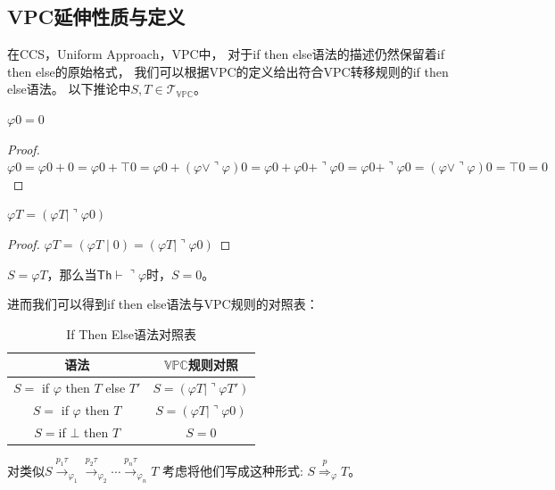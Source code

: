 \subsection{VPC延伸性质与定义}

在CCS，Uniform Approach，VPC中，
对于if then else语法的描述仍然保留着if then else的原始格式，
我们可以根据VPC的定义给出符合VPC转移规则的if then else语法。
以下推论中$S,T\in \mathcal{T}_{\mathbb{VPC}}$。
\begin{corollary} 
   $\varphi 0 = 0$
\end{corollary}
\begin{proof}
   $\varphi 0 = \varphi 0 + 0 = \varphi 0 + \top 0 = \varphi 0 + (\varphi \vee \urcorner \varphi)0 = \varphi 0 + \varphi 0 + \urcorner \varphi 0 = \varphi 0 + \urcorner \varphi 0 = (\varphi \vee \urcorner \varphi)0 = \top 0 = 0$
\end{proof}
\begin{corollary}
   $\varphi T = (\varphi T\mid \urcorner \varphi 0)$
\end{corollary}
\begin{proof}
   $\varphi T = (\varphi T\mid 0) = (\varphi T\mid \urcorner \varphi 0)$
\end{proof}
\begin{corollary}
   $S=\varphi T$，那么当$\mathsf{Th}\vdash \urcorner \varphi$时，$S=0$。
\end{corollary}
进而我们可以得到if then else语法与VPC规则的对照表：
\begin{table}[!hpt]
   \caption[If Then Else语法对照表]{If Then Else语法对照表\footnotemark}
   \label{tab:ifthenelse}
   \centering
   \begin{tabular}{@{}cc@{}} \toprule
     语法 & $\mathbb{VPC}$规则对照 \\ \midrule
     $S=$ if $\varphi$ then $T$ else $T'$& $S=(\varphi T|\urcorner \varphi T')$\\
     $S=$ if $\varphi$ then $T$ & $S=(\varphi T|\urcorner\varphi 0)$\\
     $S = $if $\bot$ then $T$ & $S=0$\\ \bottomrule
   \end{tabular}
 \end{table}

对类似$S\stackrel{p_1\tau}{\rightarrow}_{\varphi_1}\stackrel{p_2\tau}{\rightarrow}_{\varphi_2}\cdots\stackrel{p_n\tau}{\rightarrow}_{\varphi_n} T$
考虑将他们写成这种形式: $S\stackrel{p}{\Rightarrow}_{\varphi} T$。

